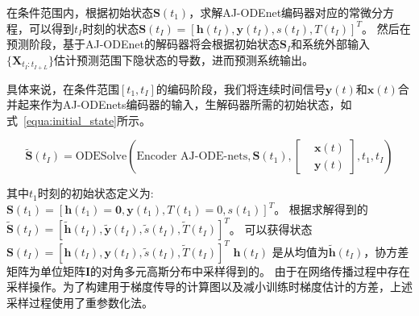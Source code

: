 在条件范围内，根据初始状态$\boldsymbol S(t_1)$，求解AJ-ODEnet编码器对应的常微分方程，可以得到$t_I$时刻的状态$\boldsymbol S(t_I)=[\boldsymbol h(t_I), \boldsymbol y(t_I), s(t_I), T(t_I)]^T$。
然后在预测阶段，基于AJ-ODEnet的解码器将会根据初始状态${\boldsymbol{S}}_I$和系统外部输入$\{{\boldsymbol {X}}_{t_{I}:t_{I+L}}\}$估计预测范围下隐状态的导数，进而预测系统输出。

具体来说，在条件范围$[t_1, t_I]$的编码阶段，我们将连续时间信号$\boldsymbol y(t)$和$\boldsymbol x(t)$合并起来作为AJ-ODEnets编码器的输入，生解码器所需的初始状态，如式~\eqref{equa:initial_state}所示。

\begin{equation}
\boldsymbol{\tilde S}(t_I)=\text{ODESolve}(\text{Encoder AJ-ODE-nets},\boldsymbol S(t_1)
, 
\left [
\begin{aligned} 
&\boldsymbol {x}(t) \\
&\boldsymbol {y}(t)
\end{aligned}
\right ]
, t_1, t_I)
\label{equa:initial_state}
\end{equation}

其中$t_1$时刻的初始状态定义为:
$
\boldsymbol S(t_1)=\left[\boldsymbol h(t_1) = \boldsymbol 0,\boldsymbol y(t_1),T(t_1)=0,s(t_1)\right ]^T
$。 
根据求解得到的
$\boldsymbol{\tilde{S}}(t_I)=[\boldsymbol{\tilde h}(t_I), \boldsymbol{\tilde y}(t_I), \tilde s(t_I), \tilde T(t_I)]^T$。
可以获得状态$\boldsymbol{S}(t_I)=[\boldsymbol{h}(t_I), \boldsymbol{y}(t_I), \tilde s(t_I), \tilde T(t_I)]^T$
$\boldsymbol{h}(t_I)$ 是从均值为$\boldsymbol{\tilde h}(t_I)$，协方差矩阵为单位矩阵$\boldsymbol I$的对角多元高斯分布中采样得到的。
由于在网络传播过程中存在采样操作。为了构建用于梯度传导的计算图以及减小训练时梯度估计的方差，上述采样过程使用了重参数化法\cite{kingma2013auto}。

